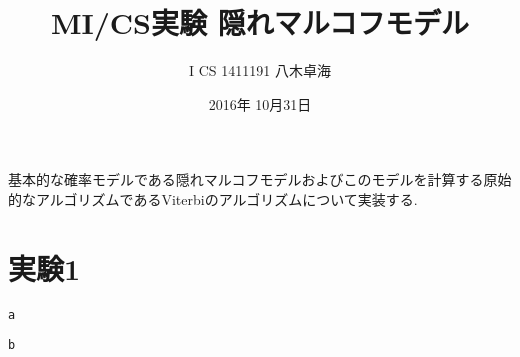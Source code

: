 \documentclass[a4paper]{jarticle}
\title{MI/CS実験 隠れマルコフモデル}
\author{I CS 1411191 八木卓海}
\date{2016年 10月31日}
\begin{document}
\maketitle
基本的な確率モデルである隠れマルコフモデルおよびこのモデルを計算する原始的なアルゴリズムであるViterbiのアルゴリズムについて実装する.

\section{実験1}

\begin{lstlisting}[basicstyle=\ttfamily\footnotesize, frame=single, caption=main.py]
a
\end{lstlisting}

\begin{lstlisting}[basicstyle=\ttfamily\footnotesize, frame=single, caption=bg.pyx]
b
\end{lstlisting}
\end{document}
